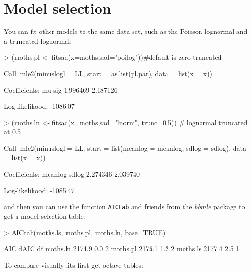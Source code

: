 \documentclass[11pt, A4]{article}
\newcommand{\code}[1]{\texttt{#1}}
\begin{document}
\section{Model selection}

You can fit other models to the same data set, such as the Poisson-lognormal and a truncated lognormal:
\begin{Schunk}
\begin{Sinput}
> (moths.pl <- fitsad(x=moths,sad="poilog"))#default is zero-truncated
\end{Sinput}
\begin{Soutput}
Call:
mle2(minuslogl = LL, start = as.list(pl.par), data = list(x = x))

Coefficients:
      mu      sig 
1.996469 2.187126 

Log-likelihood: -1086.07 
\end{Soutput}
\begin{Sinput}
> (moths.ln <- fitsad(x=moths,sad="lnorm", trunc=0.5)) # lognormal truncated at 0.5
\end{Sinput}
\begin{Soutput}
Call:
mle2(minuslogl = LL, start = list(meanlog = meanlog, sdlog = sdlog), 
    data = list(x = x))

Coefficients:
 meanlog    sdlog 
2.274346 2.039740 

Log-likelihood: -1085.47 
\end{Soutput}
\end{Schunk}

and then you can use the function \code{AICtab} and friends from the \emph{bbmle} package to get a model selection table:

\begin{Schunk}
\begin{Sinput}
> AICtab(moths.ls, moths.pl, moths.ln, base=TRUE)
\end{Sinput}
\begin{Soutput}
         AIC    dAIC   df
moths.ln 2174.9    0.0 2 
moths.pl 2176.1    1.2 2 
moths.ls 2177.4    2.5 1 
\end{Soutput}
\end{Schunk}

To compare visually fits first get octave tables:
\end{document}
